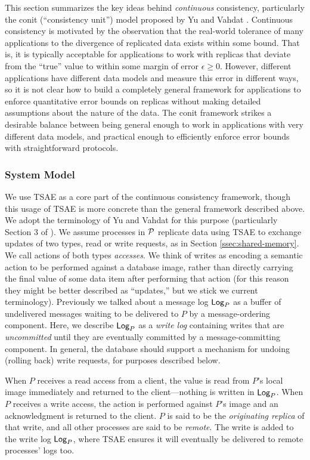 \documentclass[]             %
{NASA}                       %
\theoremstyle{definition}
\begin{document}
This section summarizes the key ideas behind \emph{continuous}
consistency, particularly the conit (``consistency unit'') model
proposed by Yu and Vahdat
\cite{2000tact,2000tactalgorithms,10.5555/1251229.1251250,DBLP:conf/icdcs/YuV01,2002tact}. Continuous
consistency is motivated by the observation that the real-world
tolerance of many applications to the divergence of replicated data
exists within some bound. That is, it is typically acceptable for
applications to work with replicas that deviate from the ``true''
value to within some margin of error $\epsilon \geq 0$. However,
different applications have different data models and measure this
error in different ways, so it is not clear how to build a completely
general framework for applications to enforce quantitative error
bounds on replicas without making detailed assumptions about the
nature of the data. The conit framework strikes a desirable balance
between being general enough to work in applications with very
different data models, and practical enough to efficiently enforce
error bounds with straightforward protocols.


\subsubsection{System Model}
\label{sssec:system-model}
We use TSAE as a core part of the continuous consistency framework,
though this usage of TSAE is more concrete than the general framework
described above. We adopt the terminology of Yu and Vahdat for this
purpose (particularly Section 3 of \cite{2002tact}). We assume
processes in $\mathcal{P}$ replicate data using TSAE to exchange updates
of two types, read or write requests, as in Section
\ref{ssec:shared-memory}. We call actions of both types
\emph{accesses}. We think of writes as encoding a semantic action to
be performed against a database image, rather than directly carrying
the final value of some data item after performing that action (for
this reason they might be better described as ``updates,'' but we
stick we current terminology). Previously we talked about a message
log $\textsf{Log}_{P}$ as a buffer of undelivered messages waiting to be
delivered to $P$ by a message-ordering component. Here, we describe
$\textsf{Log}_{P}$ as a \emph{write log} containing writes that are
\emph{uncommitted} until they are eventually committed by a
message-committing component. In general, the database should support
a mechanism for undoing (rolling back) write requests, for purposes
described below.

When $P$ receives a read access from a client, the value is read from
$P$'s local image immediately and returned to the client---nothing is
written in $\textsf{Log}_{P}$. When $P$ receives a write access, the action is
performed against $P$'s image and an acknowledgment is returned to the
client. $P$ is said to be the \emph{originating replica} of that
write, and all other processes are said to be \emph{remote}. The write
is added to the write log $\textsf{Log}_{P}$, where TSAE ensures it will
eventually be delivered to remote processes' logs too.
\end{document}
